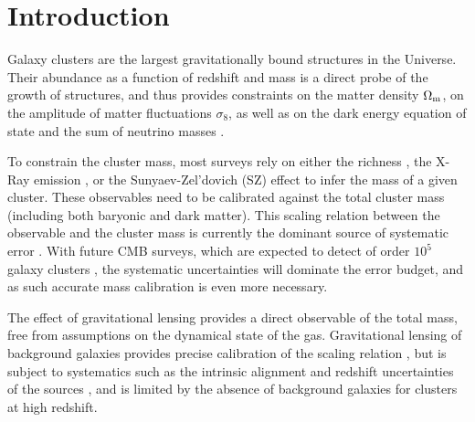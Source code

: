 \documentclass[prd, superscriptaddress, tightenlines, longbibliography, nofootinbib, eqsecnum, amsfonts, amsmath, floatfix, twocolumn, notitlepage]{revtex4-2}
\begin{document}
\section{Introduction}
\setcounter{footnote}{0}

Galaxy clusters are the largest gravitationally bound structures in the Universe. Their abundance as a function of redshift and mass is a direct probe of the growth of structures, and thus provides constraints on the matter density $\Omega_{\rm m}$, on the amplitude of matter fluctuations $\sigma_8$, as well as on the dark energy equation of state and the sum of neutrino masses \cite{Vikhlinin:2008ym,Sehgal:2010ca,Allen:2011zs,Planck:2013lkt, Mantz:2014xba,Mantz:2014paa, Planck:2015lwi,SPT:2016izt, SPT:2018njh, SPT:2021efh, Raghunathan:2021zfi}. 

To constrain the cluster mass, most surveys rely on either the richness \cite[e.g.][]{Koester:2007bj,DES:2015mqu,Andreon:2016eck, Farahi:2016xux,Simet:2016mzg}, the X-Ray emission \cite[e.g.][]{Arnaud:2005ur, Arnaud:2007br, Vikhlinin:2008ym}, or the Sunyaev-Zel'dovich (SZ) effect \cite[e.g.][]{Vanderlinde:2010eb, Planck:2013lkt,Planck:2015lwi} to infer the mass of a given cluster. These observables need to be calibrated against the total cluster mass (including both baryonic and dark matter).
This scaling relation between the observable and the cluster mass is currently the dominant source of systematic error \cite{Pratt:2019cnf, Salvati:2020exw, Salvati:2021gkt}.
With future CMB surveys, which are expected to detect of order $10^5$ galaxy clusters \cite{Madhavacheril:2017onh, SimonsObservatory:2018koc, CMB-S4:2016ple, Raghunathan:2021zfi}, the systematic uncertainties will dominate the error budget, and as such accurate mass calibration is even more necessary.

The effect of gravitational lensing provides a direct observable of the total mass, free from assumptions on the dynamical state of the gas.
Gravitational lensing of background galaxies provides precise calibration of the scaling relation \cite{vonderLinden:2014haa, Hoekstra:2015gda, Smith:2015qhs, Sereno:2017zcn, Penna-Lima:2016tvo, Bellagamba:2018gec,Miyatake:2018lpb, Umetsu:2020wlf}, but is subject to systematics such as the intrinsic alignment and redshift uncertainties of the sources \cite{Becker:2010xj}, and is limited by the absence of background galaxies for clusters at high redshift.
\end{document}
